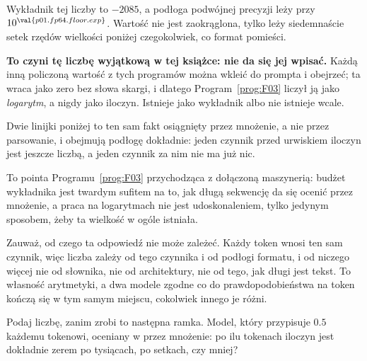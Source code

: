 \begin{fr}
Wykładnik tej liczby to $-2085$, a podłoga podwójnej precyzji leży przy
$10^{\val{p01.fp64.floor.exp}}$. Wartość nie jest zaokrąglona, tylko leży
siedemnaście setek rzędów wielkości poniżej czegokolwiek, co format pomieści.


\begin{note}
\textbf{To czyni tę liczbę wyjątkową w tej książce: nie da się jej wpisać.}
Każdą inną policzoną wartość z tych programów można wkleić do prompta i
obejrzeć; ta wraca jako zero bez słowa skargi, i dlatego
Program~\ref{prog:F03} liczył ją jako \emph{logarytm}, a nigdy jako iloczyn.
Istnieje jako wykładnik albo nie istnieje wcale.

Dwie linijki poniżej to ten sam fakt osiągnięty przez mnożenie, a nie przez
parsowanie, i obejmują podłogę dokładnie: jeden czynnik przed urwiskiem
iloczyn jest jeszcze liczbą, a jeden czynnik za nim nie ma już nic.
\end{note}

To pointa Programu~\ref{prog:F03} przychodząca z dołączoną maszynerią: budżet
wykładnika jest twardym sufitem na to, jak długą sekwencję da się ocenić przez
mnożenie, a praca na logarytmach nie jest udoskonaleniem, tylko jedynym
sposobem, żeby ta wielkość w ogóle istniała.

Zauważ, od czego ta odpowiedź nie może zależeć. Każdy token wnosi ten sam
czynnik, więc liczba zależy od tego czynnika i od podłogi formatu, i od niczego
więcej \dash{} nie od słownika, nie od architektury, nie od tego, jak długi
jest tekst. To własność arytmetyki, a dwa modele zgodne co do
prawdopodobieństwa na token kończą się w tym samym miejscu, cokolwiek innego
je różni.

Podaj liczbę, zanim zrobi to następna ramka. Model, który przypisuje
$\num{0.5}$ każdemu tokenowi, oceniany w  przez mnożenie: po ilu
tokenach iloczyn jest dokładnie zerem \dash{} po tysiącach, po setkach, czy
mniej?
\dotline
\nextframe
\end{fr}


